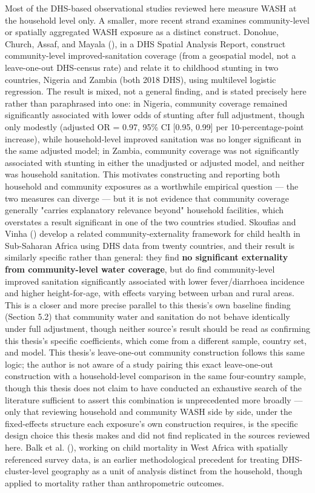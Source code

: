 Most of the DHS-based observational studies reviewed here measure WASH at the household level only. A smaller, more recent strand examines community-level or spatially aggregated WASH exposure as a distinct construct. Donohue, Church, Assaf, and Mayala (\citeyear{Donohue2023}), in a DHS Spatial Analysis Report, construct community-level improved-sanitation coverage (from a geospatial model, not a leave-one-out DHS-census rate) and relate it to childhood stunting in two countries, Nigeria and Zambia (both 2018 DHS), using multilevel logistic regression. The result is mixed, not a general finding, and is stated precisely here rather than paraphrased into one: in Nigeria, community coverage remained significantly associated with lower odds of stunting after full adjustment, though only modestly (adjusted OR = 0.97, 95\% CI [0.95, 0.99] per 10-percentage-point increase), while household-level improved sanitation was no longer significant in the same adjusted model; in Zambia, community coverage was not significantly associated with stunting in either the unadjusted or adjusted model, and neither was household sanitation. This motivates constructing and reporting both household and community exposures as a worthwhile empirical question --- the two measures can diverge --- but it is not evidence that community coverage generally "carries explanatory relevance beyond" household facilities, which overstates a result significant in one of the two countries studied. Skoufias and Vinha (\citeyear{SkoufiasVinha2026}) develop a related community-externality framework for child health in Sub-Saharan Africa using DHS data from twenty countries, and their result is similarly specific rather than general: they find \textbf{no significant externality from community-level water coverage}, but do find community-level improved sanitation significantly associated with lower fever/diarrhoea incidence and higher height-for-age, with effects varying between urban and rural areas. This is a closer and more precise parallel to this thesis's own baseline finding (Section 5.2) that community water and sanitation do not behave identically under full adjustment, though neither source's result should be read as confirming this thesis's specific coefficients, which come from a different sample, country set, and model. This thesis's leave-one-out community construction follows this same logic; the author is not aware of a study pairing this exact leave-one-out construction with a household-level comparison in the same four-country sample, though this thesis does not claim to have conducted an exhaustive search of the literature sufficient to assert this combination is unprecedented more broadly --- only that reviewing household and community WASH side by side, under the fixed-effects structure each exposure's own construction requires, is the specific design choice this thesis makes and did not find replicated in the sources reviewed here. Balk et al. (\citeyear{Balk2004}), working on child mortality in West Africa with spatially referenced survey data, is an earlier methodological precedent for treating DHS-cluster-level geography as a unit of analysis distinct from the household, though applied to mortality rather than anthropometric outcomes.

